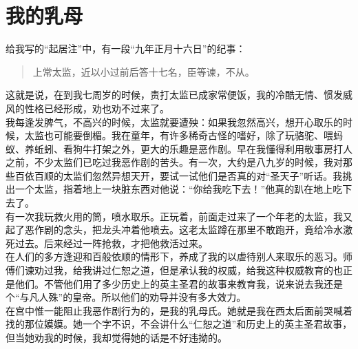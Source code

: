 \fancyhead[RO]{} %
\fancyhead[LE]{} %
\chapter*{我的乳母}
\thispagestyle{empty}
给我写的“起居注”中，有一段“九年正月十六日”的纪事：\\

\begin{quote}
	上常太监，近以小过前后答十七名，臣等谏，不从。\\
\end{quote}

这就是说，在到我七周岁的时候，责打太监已成家常便饭，我的冷酷无情、惯发威风的性格已经形成，劝也劝不过来了。\\

我每逢发脾气，不高兴的时候，太监就要遭殃：如果我忽然高兴，想开心取乐的时候，太监也可能要倒楣。我在童年，有许多稀奇古怪的嗜好，除了玩骆驼、喂蚂蚁、养蚯蚓、看狗牛打架之外，更大的乐趣是恶作剧。早在我懂得利用敬事房打人之前，不少太监们已吃过我恶作剧的苦头。有一次，大约是八九岁的时候，我对那些百依百顺的太监们忽然异想天开，要试一试他们是否真的对“圣天子”听话。我挑出一个太监，指着地上一块脏东西对他说：“你给我吃下去！”他真的趴在地上吃下去了。\\

有一次我玩救火用的筒，喷水取乐。正玩着，前面走过来了一个年老的太监，我又起了恶作剧的念头，把龙头冲着他喷去。这老太监蹲在那里不敢跑开，竟给冷水激死过去。后来经过一阵抢救，才把他救活过来。\\

在人们的多方逢迎和百般依顺的情形下，养成了我的以虐待别人来取乐的恶习。师傅们谏劝过我，给我讲过仁恕之道，但是承认我的权威，给我这种权威教育的也正是他们。不管他们用了多少历史上的英主圣君的故事来教育我，说来说去我还是个“与凡人殊”的皇帝。所以他们的劝导并没有多大效力。\\

在宫中惟一能阻止我恶作剧行为的，是我的乳母氏。她就是我在西太后面前哭喊着找的那位嫫嫫。她一个字不识，不会讲什么“仁恕之道”和历史上的英主圣君故事，但当她劝我的时候，我却觉得她的话是不好违拗的。\\

